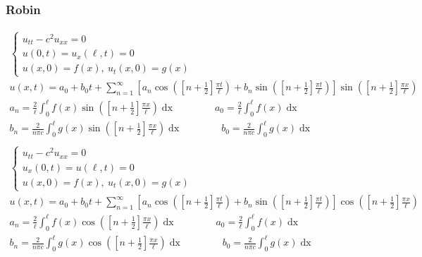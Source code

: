 \documentclass{article}
\begin{document}
\subsubsection*{Robin}
\begin{gather*}
\begin{cases}
u_{tt} - c^{2}u_{xx} = 0\\
u(0,t) = u_{x}(\ell,t) = 0\\
u(x,0) = f(x),\ u_{t}(x,0) = g(x)
\end{cases}\\
u(x,t) = a_{0} + b_{0}t +\sum_{n=1}^{\infty}\left[a_{n}\cos{\left(\left[n + \frac{1}{2}\right]\frac{\pi t}{\ell}\right)} + b_{n}\sin{\left(\left[n + \frac{1}{2}\right]\frac{\pi t}{\ell}\right)}\right]\sin{\left(\left[n + \frac{1}{2}\right]\frac{\pi x}{\ell}\right)}\\
a_{n} = \frac{2}{\ell}\int_{0}^{\ell}f(x)\sin{\left(\left[n + \frac{1}{2}\right]\frac{\pi x}{\ell}\right)}\mathop{dx}\qquad\qquad
a_{0} = \frac{2}{\ell}\int_{0}^{\ell}f(x)\mathop{dx}\\
b_{n} = \frac{2}{n\pi c}\int_{0}^{\ell}g(x)\sin{\left(\left[n + \frac{1}{2}\right]\frac{\pi x}{\ell}\right)}\mathop{dx}\qquad\qquad
b_{0} = \frac{2}{n\pi c}\int_{0}^{\ell}g(x)\mathop{dx}\\
\end{gather*}
\begin{gather*}
\begin{cases}
u_{tt} - c^{2}u_{xx} = 0\\
u_{x}(0,t) = u(\ell,t) = 0\\
u(x,0) = f(x),\ u_{t}(x,0) = g(x)
\end{cases}\\
u(x,t) = a_{0} + b_{0}t +\sum_{n=1}^{\infty}\left[a_{n}\cos{\left(\left[n + \frac{1}{2}\right]\frac{\pi t}{\ell}\right)} + b_{n}\sin{\left(\left[n + \frac{1}{2}\right]\frac{\pi t}{\ell}\right)}\right]\cos{\left(\left[n + \frac{1}{2}\right]\frac{\pi x}{\ell}\right)}\\
a_{n} = \frac{2}{\ell}\int_{0}^{\ell}f(x)\cos{\left(\left[n + \frac{1}{2}\right]\frac{\pi x}{\ell}\right)}\mathop{dx}\qquad\qquad
a_{0} = \frac{2}{\ell}\int_{0}^{\ell}f(x)\mathop{dx}\\
b_{n} = \frac{2}{n\pi c}\int_{0}^{\ell}g(x)\cos{\left(\left[n + \frac{1}{2}\right]\frac{\pi x}{\ell}\right)}\mathop{dx}\qquad\qquad
b_{0} = \frac{2}{n\pi c}\int_{0}^{\ell}g(x)\mathop{dx}\\
\end{gather*}
\end{document}
